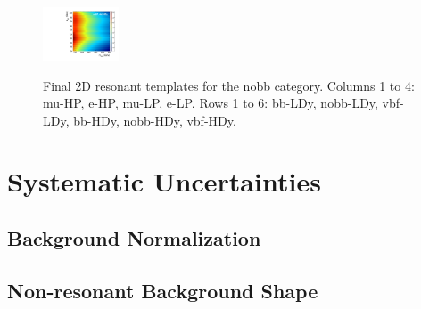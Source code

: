 \begin{figure}[htbp]
  \includegraphics[width=0.2\textwidth]{fig/analysisAppendix/template_res_e_LP_vbf_HDy.pdf}\\
  \caption{
    Final 2D resonant templates for the nobb category.
    Columns 1 to 4: mu-HP, e-HP, mu-LP, e-LP.
    Rows 1 to 6: bb-LDy, nobb-LDy, vbf-LDy, bb-HDy, nobb-HDy, vbf-HDy.
  }
  \label{fig:template_res_Run2}
\end{figure}

\section{Systematic Uncertainties}

\subsection{Background Normalization}

\subsection{Non-resonant Background Shape}


